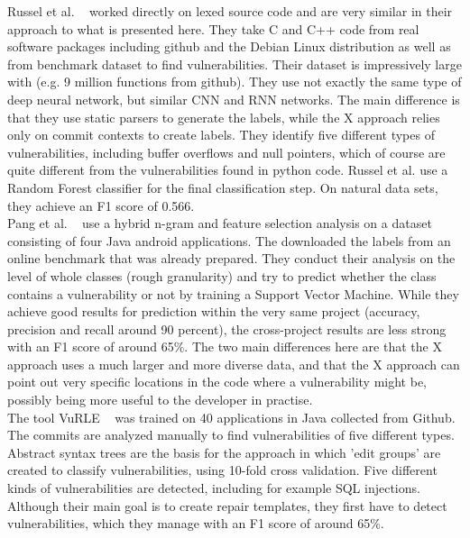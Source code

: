 \documentclass[
	a4paper,
	pagesize,
	pdftex,
	12pt,
	twoside, %
	BCOR=5mm, %
	ngerman,
	fleqn,
	final,
	]{scrartcl}
\begin{document}
Russel et al. ~\cite{Russell.2018} worked directly on lexed source code and are very similar in their approach to what is presented here. They take C and C++ code from real software packages including github and the Debian Linux distribution as well as from benchmark dataset to find vulnerabilities. Their dataset is impressively large with (e.g. 9 million functions from github). They use not exactly the same type of deep neural network, but similar CNN and RNN networks. The main difference is that they use static parsers to generate the labels, while the X approach relies only on commit contexts to create labels. They identify five different types of vulnerabilities, including buffer overflows and null pointers, which of course are quite different from the vulnerabilities found in python code. Russel et al. use a Random Forest classifier for the final classification step. On natural data sets, they achieve an F1 score of 0.566.\\

Pang et al. ~\cite{Pang.2015} use a hybrid n-gram and feature selection analysis on a dataset consisting of four Java android applications. The downloaded the labels from an online benchmark that was already prepared. They conduct their analysis on the level of whole classes (rough granularity) and try to predict whether the class contains a vulnerability or not by training a Support Vector Machine. While they achieve good results for prediction within the very same project (accuracy, precision and recall around 90 percent), the cross-project results are less strong with an F1 score of around 65\%. The two main differences here are that the X approach uses a much larger and more diverse data, and that the X approach can point out very specific locations in the code where a vulnerability might be, possibly being more useful to the developer in practise.\\

The tool VuRLE ~\cite{Ma.2017} was trained on 40 applications in Java collected from Github. The commits are analyzed manually to find vulnerabilities of five different types. Abstract syntax trees are the basis for the approach in which 'edit groups' are created to classify vulnerabilities, using 10-fold cross validation. Five different kinds of vulnerabilities are detected, including for example SQL injections. Although their main goal is to create repair templates, they first have to detect vulnerabilities, which they manage with an F1 score of around 65\%. \\
\end{document}
